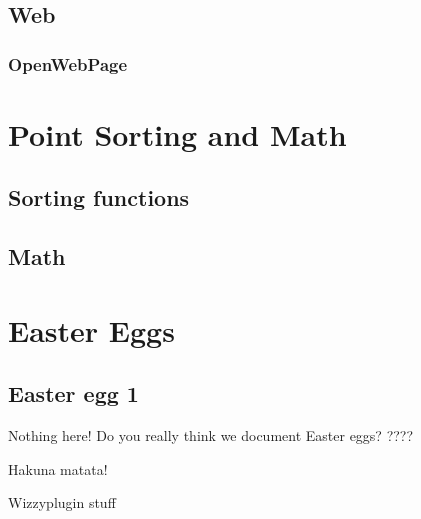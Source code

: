 \documentclass[a4paper]{report}
\begin{document}
\section{Web}

\subsection{OpenWebPage}

\chapter{Point Sorting and Math}
\section{Sorting functions}

\section{Math}

\chapter{Easter Eggs}
\section{Easter egg 1}
Nothing here! Do you really think we document Easter eggs?
????

Hakuna matata!

Wizzyplugin stuff
\end{document}

